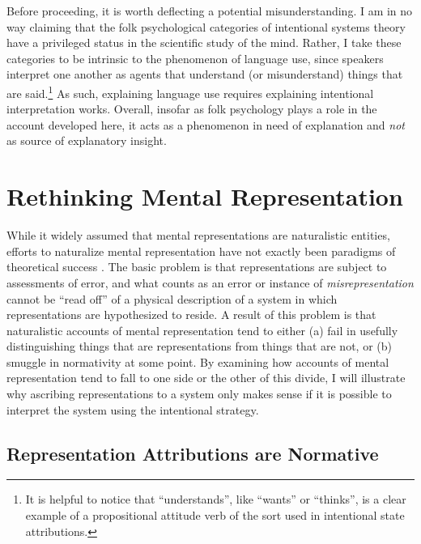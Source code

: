 Before proceeding, it is worth deflecting a potential misunderstanding. I am in no way claiming that the folk psychological categories of intentional systems theory have a privileged status in the scientific study of the mind. Rather, I take these categories to be intrinsic to the phenomenon of language use, since speakers interpret one another as agents that understand (or misunderstand) things that are said.\footnote{It is helpful to notice that ``understands'', like ``wants'' or ``thinks'', is a clear example of a propositional attitude verb of the sort used in intentional state attributions.} As such, explaining language use requires explaining  intentional interpretation works. Overall, insofar as folk psychology plays a role in the account developed here, it acts as a phenomenon in need of explanation and \textit{not} as source of explanatory insight. 

\section{Rethinking Mental Representation}

While it widely assumed that mental representations are naturalistic entities, efforts to naturalize mental representation have not exactly been paradigms of theoretical success \citep[][Ch. 3]{Horwich:2005}. The basic problem is that representations are subject to assessments of error, and what counts as an error or instance of \textit{misrepresentation} cannot be ``read off'' of a physical description of a system in which representations are hypothesized to reside. A result of this problem is that naturalistic accounts of mental representation tend to either (a) fail in usefully distinguishing things that are representations from things that are not, or (b) smuggle in normativity at some point. By examining how accounts of mental representation tend to fall to one side or the other of this divide, I will illustrate why ascribing representations to a system only makes sense if it is possible to interpret the system using the intentional strategy. 

\subsection{Representation Attributions are Normative}

